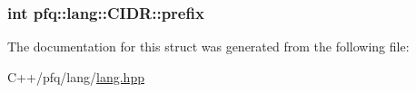 \subsubsection[{\texorpdfstring{prefix}{prefix}}]{\setlength{\rightskip}{0pt plus 5cm}int pfq\+::lang\+::\+C\+I\+D\+R\+::prefix}\hypertarget{structpfq_1_1lang_1_1CIDR_a1e9458595008285f0831c39e9d87a105}{}\label{structpfq_1_1lang_1_1CIDR_a1e9458595008285f0831c39e9d87a105}


The documentation for this struct was generated from the following file\+:\begin{DoxyCompactItemize}
\item 
C++/pfq/lang/\hyperlink{lang_8hpp}{lang.\+hpp}\end{DoxyCompactItemize}
